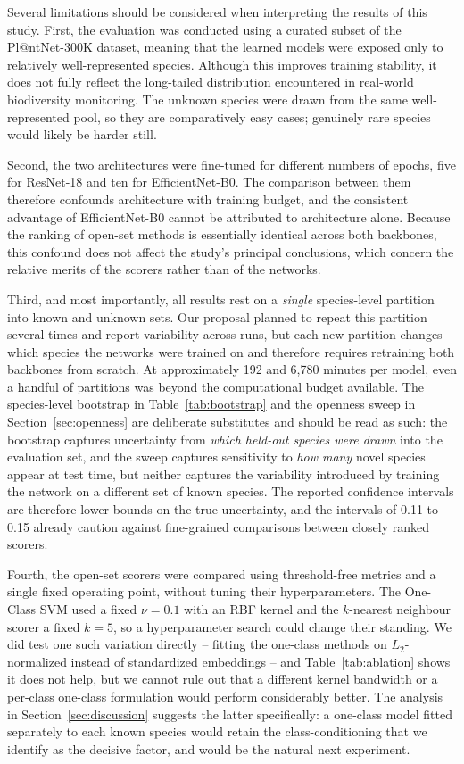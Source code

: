 \documentclass[11pt]{article}
\begin{document}
Several limitations should be considered when interpreting the results of this study. First, the evaluation was conducted using a curated subset of the Pl@ntNet-300K dataset, meaning that the learned models were exposed only to relatively well-represented species. Although this improves training stability, it does not fully reflect the long-tailed distribution encountered in real-world biodiversity monitoring. The unknown species were drawn from the same well-represented pool, so they are comparatively easy cases; genuinely rare species would likely be harder still.

Second, the two architectures were fine-tuned for different numbers of epochs, five for ResNet-18 and ten for EfficientNet-B0. The comparison between them therefore confounds architecture with training budget, and the consistent advantage of EfficientNet-B0 cannot be attributed to architecture alone. Because the ranking of open-set methods is essentially identical across both backbones, this confound does not affect the study's principal conclusions, which concern the relative merits of the scorers rather than of the networks.

Third, and most importantly, all results rest on a \emph{single} species-level partition into known and unknown sets. Our proposal planned to repeat this partition several times and report variability across runs, but each new partition changes which species the networks were trained on and therefore requires retraining both backbones from scratch. At approximately 192 and 6,780 minutes per model, even a handful of partitions was beyond the computational budget available. The species-level bootstrap in Table~\ref{tab:bootstrap} and the openness sweep in Section~\ref{sec:openness} are deliberate substitutes and should be read as such: the bootstrap captures uncertainty from \emph{which held-out species were drawn} into the evaluation set, and the sweep captures sensitivity to \emph{how many} novel species appear at test time, but neither captures the variability introduced by training the network on a different set of known species. The reported confidence intervals are therefore lower bounds on the true uncertainty, and the intervals of 0.11 to 0.15 already caution against fine-grained comparisons between closely ranked scorers.

Fourth, the open-set scorers were compared using threshold-free metrics and a single fixed operating point, without tuning their hyperparameters. The One-Class SVM used a fixed $\nu = 0.1$ with an RBF kernel and the $k$-nearest neighbour scorer a fixed $k = 5$, so a hyperparameter search could change their standing. We did test one such variation directly -- fitting the one-class methods on $L_2$-normalized instead of standardized embeddings -- and Table~\ref{tab:ablation} shows it does not help, but we cannot rule out that a different kernel bandwidth or a per-class one-class formulation would perform considerably better. The analysis in Section~\ref{sec:discussion} suggests the latter specifically: a one-class model fitted separately to each known species would retain the class-conditioning that we identify as the decisive factor, and would be the natural next experiment.
\end{document}
